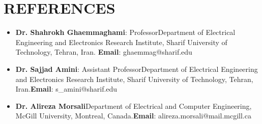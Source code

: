 \documentclass[letterpaper,11pt]{article}
\newcommand{\resumeSubHeadingListStart}{\begin{itemize}[leftmargin=0.0in, label={}]}
\begin{document}
\section{REFERENCES}
        \begin{itemize}[itemsep=-2pt, parsep=5pt]
            \item \textbf{Dr. Shahrokh Ghaemmaghami}: Professor\newline Department of Electrical Engineering and Electronics Research Institute, Sharif University of Technology, Tehran, Iran. \newline \textbf{Email}: ghaemmag@sharif.edu 
            
            \item \textbf{Dr. Sajjad Amini}: Assistant Professor\newline Department of Electrical Engineering and Electronics Research Institute, Sharif University of Technology, Tehran, Iran.\newline \textbf{Email}: s\_amini@sharif.edu
            
            
            \item \textbf{Dr. Alireza Morsali}\newline Department of Electrical and Computer Engineering, McGill University, Montreal, Canada.\newline \textbf{Email}:  alireza.morsali@mail.mcgill.ca
        \end{itemize}
 
 
 
 
 
\end{document}

